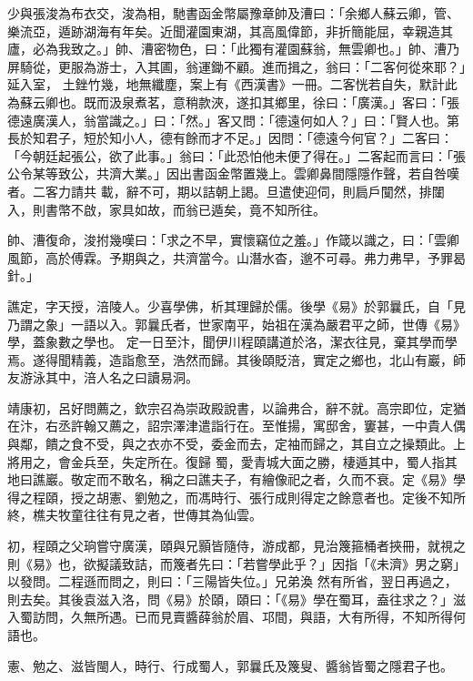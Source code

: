 \begin{pinyinscope}
 少與張浚為布衣交，浚為相，馳書函金幣屬豫章帥及漕曰：「余鄉人蘇云卿，管、樂流亞，遁跡湖海有年矣。近聞灌園東湖，其高風偉節，非折簡能屈，幸親造其廬，必為我致之。」帥、漕密物色，曰：「此獨有灌園蘇翁，無雲卿也。」帥、漕乃屏騎從，更服為游士，入其圃，翁運鋤不顧。進而揖之，翁曰：「二客何從來耶？」延入室，
 土銼竹幾，地無纖塵，案上有《西漢書》一冊。二客恍若自失，默計此為蘇云卿也。既而汲泉煮茗，意稍款浹，遂扣其鄉里，徐曰：「廣漢。」客曰：「張德遠廣漢人，翁當識之。」曰：「然。」客又問：「德遠何如人？」曰：「賢人也。第長於知君子，短於知小人，德有餘而才不足。」因問：「德遠今何官？」二客曰：「今朝廷起張公，欲了此事。」翁曰：「此恐怕他未便了得在。」二客起而言曰：「張公令某等致公，共濟大業。」因出書函金幣置幾上。雲卿鼻間隱隱作聲，若自咎嘆者。二客力請共
 載，辭不可，期以詰朝上謁。旦遣使迎伺，則扃戶闃然，排闥入，則書幣不啟，家具如故，而翁已遁矣，竟不知所往。



 帥、漕復命，浚拊幾嘆曰：「求之不早，實懷竊位之羞。」作箴以識之，曰：「雲卿風節，高於傅霖。予期與之，共濟當今。山潛水杳，邈不可尋。弗力弗早，予罪曷針。」



 譙定，字天授，涪陵人。少喜學佛，析其理歸於儒。後學《易》於郭曩氏，自「見乃謂之象」一語以入。郭曩氏者，世家南平，始祖在漢為嚴君平之師，世傳《易》學，蓋象數之學也。
 定一日至汴，聞伊川程頤講道於洛，潔衣往見，棄其學而學焉。遂得聞精義，造詣愈至，浩然而歸。其後頤貶涪，實定之鄉也，北山有巖，師友游泳其中，涪人名之曰讀易洞。



 靖康初，呂好問薦之，欽宗召為崇政殿說書，以論弗合，辭不就。高宗即位，定猶在汴，右丞許翰又薦之，詔宗澤津遣詣行在。至惟揚，寓邸舍，窶甚，一中貴人偶與鄰，饋之食不受，與之衣亦不受，委金而去，定袖而歸之，其自立之操類此。上將用之，會金兵至，失定所在。復歸
 蜀，愛青城大面之勝，棲遁其中，蜀人指其地曰譙巖。敬定而不敢名，稱之曰譙夫子，有繪像祀之者，久而不衰。定《易》學得之程頤，授之胡憲、劉勉之，而馮時行、張行成則得定之餘意者也。定後不知所終，樵夫牧童往往有見之者，世傳其為仙雲。



 初，程頤之父珦嘗守廣漢，頤與兄顥皆隨侍，游成都，見治篾箍桶者挾冊，就視之則《易》也，欲擬議致詰，而篾者先曰：「若嘗學此乎？」因指「《未濟》男之窮」以發問。二程遜而問之，則曰：「三陽皆失位。」兄弟渙
 然有所省，翌日再過之，則去矣。其後袁滋入洛，問《易》於頤，頤曰：「《易》學在蜀耳，盍往求之？」滋入蜀訪問，久無所遇。已而見賣醬薛翁於眉、邛間，與語，大有所得，不知所得何語也。



 憲、勉之、滋皆閩人，時行、行成蜀人，郭曩氏及篾叟、醬翁皆蜀之隱君子也。




\end{pinyinscope}

